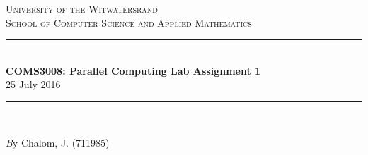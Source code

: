 \documentclass[11pt]{article}
\begin{document}
\begin{page}

\newcommand{\HRule}{\rule{\linewidth}{0.3mm}} %
\renewcommand\section{\@startsection{section}{1}{\z@}%
                                  {-3.5ex \@plus -1ex \@minus -.2ex}%
                                  {2.3ex \@plus.2ex}%
                                  {\normalfont\large\bfseries}}
\setlength{\parindent}{0pt}

\center %
 

\textsc{\LARGE University of the Witwatersrand}\\[1.5cm] %
\textsc{\Large School of Computer Science and Applied Mathematics}\\[0.5cm] %


\HRule \\[0.4cm]
{ \huge \bfseries COMS3008: Parallel Computing Lab Assignment 1}\\[0.4cm] %
  \large 25 July 2016
\HRule \\[1.5cm]
 
\begin{minipage}{1\textwidth}
	\Large \emph By Chalom, J. (711985)\\
\end{minipage}


\vfill %

\end{page}
\end{document}
